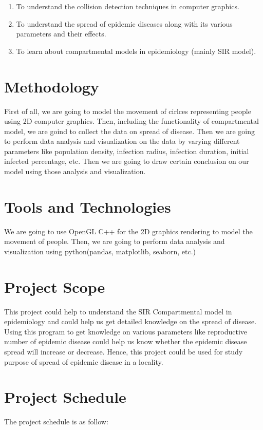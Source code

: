 \documentclass[a4paper, 12pt]{article}
\begin{document}
\begin{enumerate}
  \item To understand the collision detection techniques in computer graphics.
  \item To understand the spread of epidemic diseases along with its various parameters and their effects.
  \item To learn about compartmental models in epidemiology (mainly SIR model).
\end{enumerate}

\section{Methodology}
First of all, we are going to model the movement of cirlces representing people using 2D computer graphics. Then, including the functionality of compartmental model, we are goind to collect the data on spread of disease. Then we are going to perform data analysis and visualization on the data by varying different parameters like population density, infection radius, infection duration, initial infected percentage, etc. Then we are going to draw certain conclusion on our model using those analysis and visualization.

\section{Tools and Technologies}
We are going to use OpenGL C++ for the 2D graphics rendering to model the movement of people. Then, we are going to perform data analysis and visualization using python(pandas, matplotlib, seaborn, etc.)


\section{Project Scope}
This project could help to understand the SIR Compartmental model in epidemiology and could help us get detailed knowledge on the spread of disease. Using this program to get knowledge on various parameters like reproductive number of epidemic disease could help us know whether the epidemic disease spread will increase or decrease. Hence, this project could be used for study purpose of spread of epidemic disease in a locality.

\clearpage
\section{Project Schedule}
The project schedule is as follow:
\end{document}
